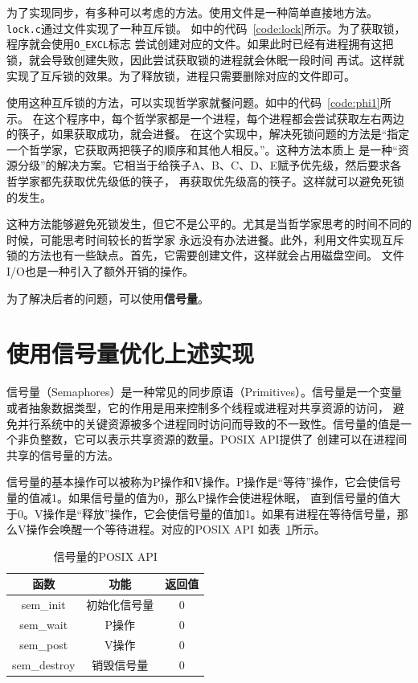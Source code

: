 \documentclass[a4paper,twoside]{article}
\begin{document}
\begin{spacing}{1.2}
为了实现同步，有多种可以考虑的方法。使用文件是一种简单直接地方法。\texttt{lock.c}通过文件实现了一种互斥锁。
如中的代码~\ref{code:lock}所示。为了获取锁，程序就会使用\texttt{O\_EXCL}标志
尝试创建对应的文件。如果此时已经有进程拥有这把锁，就会导致创建失败，因此尝试获取锁的进程就会休眠一段时间
再试。这样就实现了互斥锁的效果。为了释放锁，进程只需要删除对应的文件即可。

使用这种互斥锁的方法，可以实现哲学家就餐问题。如中的代码~\ref{code:phi1}所示。
在这个程序中，每个哲学家都是一个进程，每个进程都会尝试获取左右两边的筷子，如果获取成功，就会进餐。
在这个实现中，解决死锁问题的方法是“指定一个哲学家，它获取两把筷子的顺序和其他人相反。”。这种方法本质上
是一种“资源分级”的解决方案。它相当于给筷子A、B、C、D、E赋予优先级，然后要求各哲学家都先获取优先级低的筷子，
再获取优先级高的筷子。这样就可以避免死锁的发生。

这种方法能够避免死锁发生，但它不是公平的。尤其是当哲学家思考的时间不同的时候，可能思考时间较长的哲学家
永远没有办法进餐。此外，利用文件实现互斥锁的方法也有一些缺点。首先，它需要创建文件，这样就会占用磁盘空间。
文件I/O也是一种引入了额外开销的操作。

为了解决后者的问题，可以使用\textbf{信号量}。

\section{使用信号量优化上述实现}

信号量（Semaphores）是一种常见的同步原语（Primitives）。信号量是一个变量或者抽象数据类型，它的作用是用来控制多个线程或进程对共享资源的访问，
避免并行系统中的关键资源被多个进程同时访问而导致的不一致性。信号量的值是一个非负整数，它可以表示共享资源的数量。POSIX API提供了
创建可以在进程间共享的信号量的方法。

信号量的基本操作可以被称为P操作和V操作。P操作是“等待”操作，它会使信号量的值减1。如果信号量的值为0，那么P操作会使进程休眠，
直到信号量的值大于0。V操作是“释放”操作，它会使信号量的值加1。如果有进程在等待信号量，那么V操作会唤醒一个等待进程。对应的POSIX API
如表~\ref{tbl:sem}所示。

\begin{table}[htbp]
	\centering
	\caption{信号量的POSIX API}
	\label{tbl:sem}
	\begin{tabular}{c|c|c}
		\toprule
		\hline
		\textbf{函数} & \textbf{功能} & \textbf{返回值} \\
		\hline
		sem\_init & 初始化信号量 & 0 \\
		\hline
		sem\_wait & P操作 & 0 \\
		\hline
		sem\_post & V操作 & 0 \\
		\hline
		sem\_destroy & 销毁信号量 & 0 \\
		\hline
		\bottomrule
	\end{tabular}
\end{table}


\end{spacing}
\end{document}

